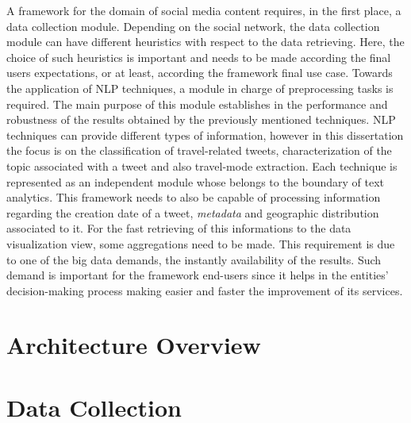 A framework for the domain of social media content requires, in the first place, a data collection module. Depending on the social network, the data collection module can have different heuristics with respect to the data retrieving. Here, the choice of such heuristics is important and needs to be made according the final users expectations, or at least, according the framework final use case. Towards the application of NLP techniques, a module in charge of preprocessing tasks is required. The main purpose of this module establishes in the performance and robustness of the results obtained by the previously mentioned techniques. NLP techniques can provide different types of information, however in this dissertation the focus is on the classification of travel-related tweets, characterization of the topic associated with a tweet and also travel-mode extraction. Each technique is represented as an independent module whose belongs to the boundary of text analytics. This framework needs to also be capable of processing information regarding the creation date of a tweet, \textit{metadata} and geographic distribution associated to it. For the fast retrieving of this informations to the data visualization view, some aggregations need to be made. This requirement is due to one of the big data demands, the instantly availability of the results. Such demand is important for the framework end-users since it helps in the entities' decision-making process making easier and faster the improvement of its services.

\section{Architecture Overview}\label{sec:architecture}

\section{Data Collection}\label{sec:data_collection}

